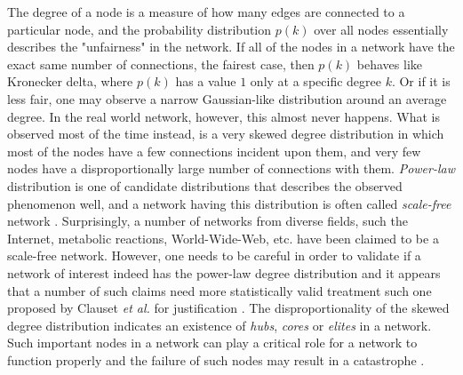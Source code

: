 \documentclass{article}
\begin{document}
	 The degree of a node is a measure of how many edges are connected to a particular node, and the probability distribution $p(k)$ over all nodes essentially describes the "unfairness" in the network. If all of the nodes in a network have the exact same number of connections, the fairest case, then $p(k)$ behaves like Kronecker delta, where $p(k)$ has a value $1$ only at a specific degree $k$. Or if it is less fair, one may observe a narrow Gaussian-like distribution around an average degree. In the real world network, however, this almost never happens. What is observed most of the time instead, is a very skewed degree distribution in which most of the nodes have a few connections incident upon them, and very few nodes have a disproportionally large number of connections with them. \textit{Power-law} distribution is one of candidate distributions that describes the observed phenomenon well, and a network having this distribution is often called \textit{scale-free} network \cite{Barabasi99emergenceScaling}. Surprisingly, a number of networks  from diverse fields, such the Internet, metabolic reactions, World-Wide-Web, etc. have been claimed to be a scale-free network. However, one needs to be careful in order to validate if a network of interest indeed has the power-law degree distribution and it appears that a number of such claims need more statistically valid treatment such one proposed by Clauset \textit{et al.} for justification \cite{Clauset:PowerLaw}. The disproportionality of the skewed degree distribution indicates an existence of  \textit{hubs}, \textit{cores} or \textit{elites} in a network. Such important nodes in a network can play a critical role for a network to function properly and the failure of such nodes may result in a catastrophe \cite{ScaleFreeAttack}.
	
\end{document}
